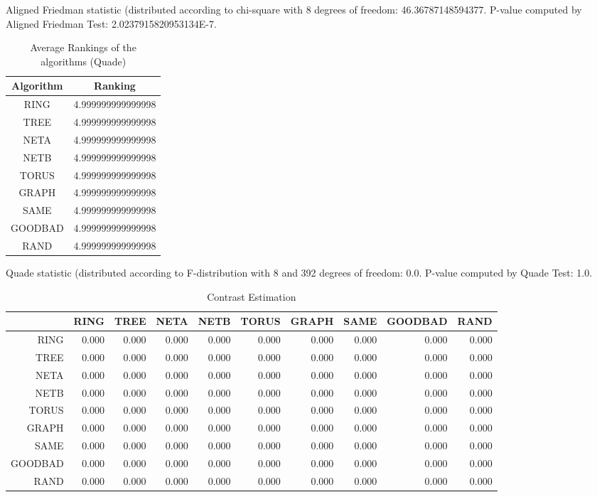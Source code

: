 \documentclass[a4paper,10pt]{article}
\begin{document}
\begin{landscape}
Aligned Friedman statistic (distributed according to chi-square with 8 degrees of freedom: 46.36787148594377. 
P-value computed by Aligned Friedman Test: 2.0237915820953134E-7.\newline


\newpage

\begin{table}[!htp]
\centering
\caption{Average Rankings of the algorithms (Quade)
}\begin{tabular}{c|c}
Algorithm&Ranking\\
\hline
 RING&4.999999999999998\\
 TREE&4.999999999999998\\
 NETA&4.999999999999998\\
 NETB&4.999999999999998\\
 TORUS&4.999999999999998\\
 GRAPH&4.999999999999998\\
 SAME&4.999999999999998\\
 GOODBAD&4.999999999999998\\
 RAND&4.999999999999998\\
\end{tabular}
\end{table}
Quade statistic (distributed according to F-distribution with 8 and 392 degrees of freedom: 0.0. 
P-value computed by Quade Test: 1.0.\newline


\newpage

\begin{table}[!htp]
\centering\tiny
\caption{Contrast Estimation}
\begin{tabular}{
|r|r|r|r|r|r|r|r|r|r|}
\hline
 & RING& TREE& NETA& NETB& TORUS& GRAPH& SAME& GOODBAD& RAND\\
\hline
 RING&0.000&0.000&0.000&0.000&0.000&0.000&0.000&0.000&0.000\\
\hline
 TREE&0.000&0.000&0.000&0.000&0.000&0.000&0.000&0.000&0.000\\
\hline
 NETA&0.000&0.000&0.000&0.000&0.000&0.000&0.000&0.000&0.000\\
\hline
 NETB&0.000&0.000&0.000&0.000&0.000&0.000&0.000&0.000&0.000\\
\hline
 TORUS&0.000&0.000&0.000&0.000&0.000&0.000&0.000&0.000&0.000\\
\hline
 GRAPH&0.000&0.000&0.000&0.000&0.000&0.000&0.000&0.000&0.000\\
\hline
 SAME&0.000&0.000&0.000&0.000&0.000&0.000&0.000&0.000&0.000\\
\hline
 GOODBAD&0.000&0.000&0.000&0.000&0.000&0.000&0.000&0.000&0.000\\
\hline
 RAND&0.000&0.000&0.000&0.000&0.000&0.000&0.000&0.000&0.000\\
\hline


\end{tabular}
\end{table}
\end{landscape}
\end{document}
